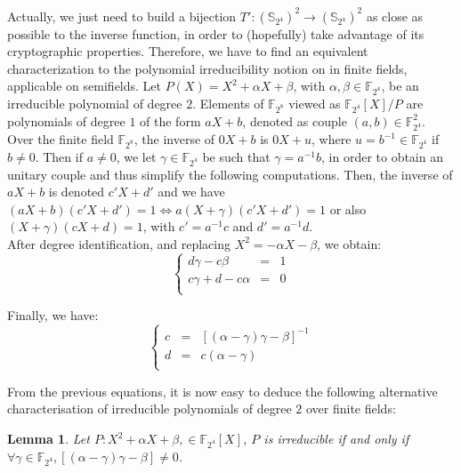 \documentclass{article}\usepackage{amsthm}
\newtheorem{mylem}{Lemma}
\begin{document}
Actually, we just need to
build a bijection  $T': (\mathbb{S}_{2^4})^2 \to  (\mathbb{S}_{2^4})^2 $ as
close as possible to the inverse function, in order to (hopefully) take advantage of its cryptographic properties.
Therefore, we have to find an equivalent characterization to the polynomial irreducibility notion on in finite fields, applicable on semifields.
Let $P(X)=X^2 + \alpha X + \beta$, with $\alpha, \beta \in \mathbb{F}_{2^4} $, 
be an irreducible polynomial of degree $2$.
Elements of $\mathbb{F}_{2^8}$ viewed as $\mathbb{F}_{2^4}[X]/P$ are polynomials of degree $1$ of the form $aX+b$, denoted as couple $(a,b)\in \mathbb{F}^2_{2^4}$.  
Over the finite field $\mathbb{F}_{2^8}$, the inverse of $0X+b$ is $0X+u$, where $u=b^{-1}\in\mathbb{F}_{2^4}$ if $b\neq 0$. Then if $a\neq 0$, 
we let $\gamma \in  \mathbb{F}_{2^4}$ be such that $\gamma = a^{-1}b$, in order to obtain an unitary couple and thus simplify the following computations.
Then, the inverse of $aX+b$ is denoted $c'X+d'$ and we have $(aX+b)(c'X+d') = 1 \Leftrightarrow a(X+\gamma)(c'X+d') = 1$ or also $(X+\gamma)(cX+d)=1$, with $c'=a^{-1}c$ and $d'=a^{-1}d$. \\
After degree identification, and replacing $X^2=-\alpha X-\beta$, we obtain: 
\begin{equation}
\left \{
\begin{array}{ccc}
    d\gamma - c \beta & = & 1 \\
   c\gamma + d - c \alpha & = & 0 \\
\end{array}
\right. 
\end{equation}


Finally, we have:
\begin{equation}  
\left \{
\begin{array}{ccc}
    c & = & [(\alpha - \gamma)\gamma -\beta]^{-1} \\
  	d & = & c(\alpha - \gamma) \\
\end{array}
\right.
\label{eq2} 
\end{equation}


From the previous equations, it is now easy to deduce the following alternative characterisation of irreducible polynomials of degree $2$ over finite fields: 
\begin{mylem}\label{lem:charact}
Let $P : X^2 + \alpha X + \beta, \in \mathbb{F}_{2^4}[X] $, $P$ is irreducible if and only if $ \forall \gamma \in \mathbb{F}_{2^4}, [(\alpha - \gamma)\gamma -\beta]  \neq 0$.
\end{mylem}
\end{document}
